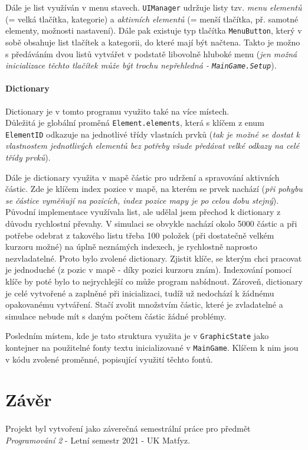\documentclass[a4paper, 12pt]{article}
\begin{document}
Dále je list využíván v menu stavech. \texttt{UIManager} udržuje listy tzv.
\emph{menu elementů} (= velká tlačítka, kategorie) a \emph{aktivních elementů}
(= menší tlačítka, př. samotné elementy, možnosti nastavení). Dále pak existuje
typ tlačítka \texttt{MenuButton}, který v sobě obsahuje list tlačítek a
kategorii, do které mají být načtena. Takto je možno s předáváním dvou listů
vytvářet v podstatě libovolně hluboké menu (\emph{jen možná inicializace těchto
tlačítek může být trochu nepřehledná - \texttt{MainGame.Setup}}).

\paragraph{Dictionary}
Dictionary je v tomto programu využito také na více místech. \\Důležitá je
globální proměná \texttt{Element.elements}, která s klíčem z enum
\texttt{ElementID} odkazuje na jednotlivé třídy vlastních prvků (\emph{tak je možné
se dostat k vlastnostem jednotlivých elementů bez potřeby všude předávat velké
odkazy na celé třídy prvků}).

Dále je dictionary využita v mapě částic pro udržení a spravování aktivních
částic. Zde je klíčem index pozice v mapě, na kterém se prvek nachází (\emph{při
pohybu se částice vyměňují na pozicích, index pozice mapy je po celou dobu
stejný}). Původní implementace využívala list, ale udělal jsem přechod k 
dictionary z důvodu rychlostní převahy. V simulaci se obvykle nachází okolo
5000 částic a při potřebe odebrat z takového listu třeba 100 položek (při
dostatečně velkém kurzoru možné) na úplně neznámých indexech, je rychlostně
naprosto nezvladatelné. Proto bylo zvolené dictionary. Zjistit klíče, se kterým
chci pracovat je jednoduché (z pozic v mapě - díky pozici kurzoru znám).
Indexování pomocí klíče by poté bylo to nejrychlejší co může program nabídnout.
Zároveň, dictionary je celé vytvořené a zaplněné při inicializaci, tudíž už
nedochází k žádnému opakovanému vytváření. Stačí zvolit množstvím částic, které
je zvladatelné a simulace nebude mít s daným počtem částic žádné problémy.

Posledním místem, kde je tato struktura využita je v \texttt{GraphicState} jako
kontejner na použitelné fonty textu inicializované v \texttt{MainGame}. Klíčem
k nim jsou v kódu zvolené proměnné, popisující využití těchto fontů.


\newpage
\section{Závěr}
\paragraph{}
Projekt byl vytvoření jako záverečná semestrální práce pro předmět
\\\emph{Programování 2} - Letní semestr 2021 - UK Matfyz.
\end{document}
